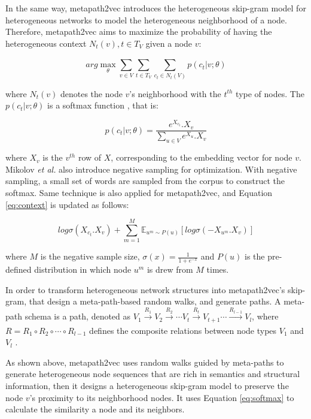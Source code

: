 In the same way, metapath2vec introduces the heterogeneous skip-gram model for heterogeneous networks to model the heterogeneous neighborhood of a node. Therefore, metapath2vec aims to maximize the probability of having the heterogeneous context $N_{t}(v), t \in T_{V}$ given a node $v$:

\begin{equation}
    arg \max_{\theta} \sum_{v \in V}^{} \sum_{t \in T_{V} }^{} \sum_{c_{t} \in N_{t}(V)}^{} p(c_{t}|v;\theta)
\label{eq:context}
\end{equation}

where $N_{t}(v)$ denotes the node $v$'s neighborhood with the $t^{th}$ type of nodes. The $p(c_{t}|v;\theta)$ is a softmax function \cite{bengio2013representation, mikolov2013distributed}, that is:

\begin{equation}
    p(c_{t}|v;\theta) = \frac{e^{X_{c_{t}}}.X_{v}}{\sum_{u \in V}^{} e^{X_{u}}.X_{v}}
\label{eq:softmax}
\end{equation}

where $X_{v}$ is the $v^{th}$ row of $X$, corresponding to the embedding vector for node $v$. Mikolov \textit{et al.} also introduce negative sampling \cite{mikolov2013distributed} for optimization. With negative sampling, a small set of words are sampled from the corpus to construct the softmax. Same technique is also applied for metapath2vec, and Equation \ref{eq:context} is updated as follows:

\begin{equation}
    log\sigma(X_{c_{t}}.X_{v}) + \sum_{m=1}^{M} \mathbb{E}_{u^{m}\sim P(u)}[log\sigma(-X_{u^{m}}.X_{v})]
\end{equation}

where $M$ is the negative sample size, $\sigma (x) = \frac{1}{1+e^{-x}}$ and $P(u)$ is the pre-defined distribution in which node $u^{m}$ is drew from $M$ times.

In order to transform heterogeneous network structures into metapath2vec's skip-gram, that design a meta-path-based random walks, and generate paths. A meta-path schema is a path, denoted as $V_{1} \xrightarrow[]{R_{1}} V_{2} \xrightarrow[]{R_{2}}\cdots V_{t} \xrightarrow[]{R_{t}} V_{t+1} \cdots \xrightarrow[]{R_{l-1}} V_{l}$, where $R = R_{1} \circ R_{2} \circ \cdots \circ R_{l-1}$ defines the composite relations between node types $V_{1}$ and $V_{l}$ \cite{sun2012mining}.

As shown above, metapath2vec uses random walks guided by meta-paths to generate heterogeneous node sequences that are rich in semantics and structural information, then it designs a heterogeneous skip-gram model to preserve the node $v$'s proximity to its neighborhood nodes. It uses Equation \ref{eq:softmax} to calculate the similarity a node and its neighbors.

